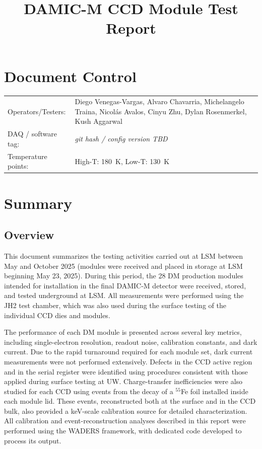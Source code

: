 \documentclass[11pt]{article}
\title{DAMIC-M CCD Module Test Report\\ }
\date{\ReportDate}
\newcommand{\todonote}[1]{{\color{orange}\itshape #1}}
\newcommand{\ModuleID}{DM01--DM28, PD06-08}
\newcommand{\CCDList}{CCD1, CCD2, CCD3, CCD4}
\newcommand{\TestLocation}{LSM / DAMIC-M Test Stand}
\newcommand{\Operators}{Diego Venegas-Vargas, Alvaro Chavarria, Michelangelo Traina, Nicol\'as Avalos, Cinyu Zhu, Dylan Rosenmerkel, Kush Aggarwal}
\newcommand{\SoftwareTag}{\todonote{git hash / config version TBD}}
\newcommand{\TempPoints}{High-T: \SI{+180}{\kelvin}, Low-T: \SI{130}{\kelvin}}
\begin{document}
\maketitle
\vspace{-1em}

\section*{Document Control}
\begin{tabular}{@{}lp{4.7in}@{}}
\toprule
Operators/Testers: & \Operators \\
DAQ / software tag: & \SoftwareTag \\
Temperature points: & \TempPoints \\
\bottomrule
\end{tabular}

\tableofcontents
\newpage

\section{Summary}
\label{sec:summary}

\subsection{Overview}
This document summarizes the testing activities carried out at LSM between May and October 2025 (modules were received and placed in storage at LSM beginning May 23, 2025). During this period, the 28 DM production modules intended for installation in the final DAMIC-M detector were received, stored, and tested underground at LSM. All measurements were performed using the JH2 test chamber, which was also used during the surface testing of the individual CCD dies and modules.

The performance of each DM module is presented across several key metrics, including single-electron resolution, readout noise, calibration constants, and dark current. Due to the rapid turnaround required for each module set, dark current measurements were not performed extensively. Defects in the CCD active region and in the serial register were identified using procedures consistent with those applied during surface testing at UW. Charge-transfer inefficiencies were also studied for each CCD using events from the decay of a $^{55}$Fe foil installed inside each module lid. These events, reconstructed both at the surface and in the CCD bulk, also provided a keV-scale calibration source for detailed characterization. All calibration and event-reconstruction analyses described in this report were performed using the WADERS framework, with dedicated code developed to process its output.
\end{document}
